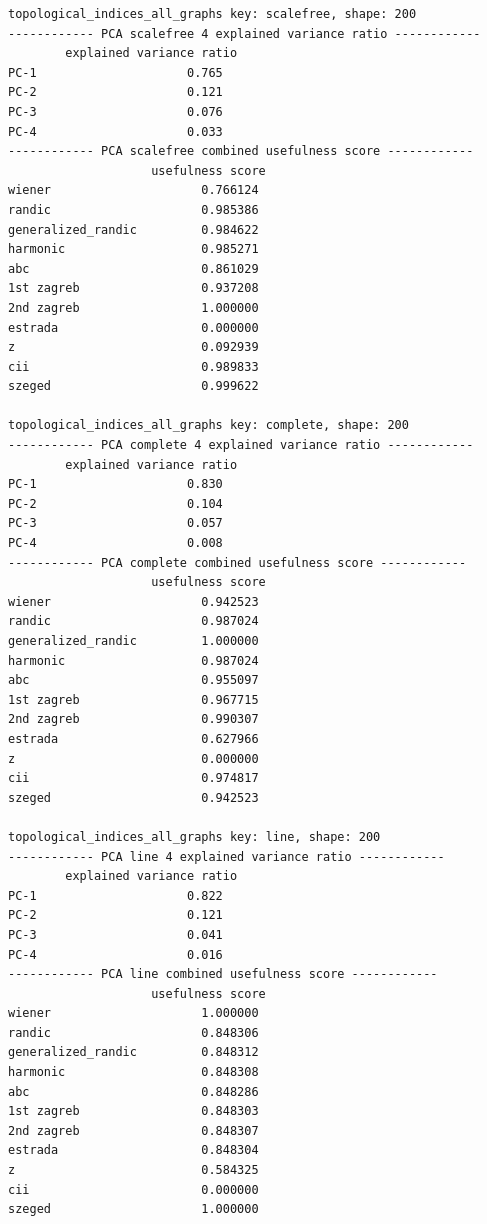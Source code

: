 \begin{code}
\begin{verbatim}
topological_indices_all_graphs key: scalefree, shape: 200
------------ PCA scalefree 4 explained variance ratio ------------
        explained variance ratio
PC-1                     0.765
PC-2                     0.121
PC-3                     0.076
PC-4                     0.033
------------ PCA scalefree combined usefulness score ------------
                    usefulness score
wiener                     0.766124
randic                     0.985386
generalized_randic         0.984622
harmonic                   0.985271
abc                        0.861029
1st zagreb                 0.937208
2nd zagreb                 1.000000
estrada                    0.000000
z                          0.092939
cii                        0.989833
szeged                     0.999622

topological_indices_all_graphs key: complete, shape: 200
------------ PCA complete 4 explained variance ratio ------------
        explained variance ratio
PC-1                     0.830
PC-2                     0.104
PC-3                     0.057
PC-4                     0.008
------------ PCA complete combined usefulness score ------------
                    usefulness score
wiener                     0.942523
randic                     0.987024
generalized_randic         1.000000
harmonic                   0.987024
abc                        0.955097
1st zagreb                 0.967715
2nd zagreb                 0.990307
estrada                    0.627966
z                          0.000000
cii                        0.974817
szeged                     0.942523

topological_indices_all_graphs key: line, shape: 200
------------ PCA line 4 explained variance ratio ------------
        explained variance ratio
PC-1                     0.822
PC-2                     0.121
PC-3                     0.041
PC-4                     0.016
------------ PCA line combined usefulness score ------------
                    usefulness score
wiener                     1.000000
randic                     0.848306
generalized_randic         0.848312
harmonic                   0.848308
abc                        0.848286
1st zagreb                 0.848303
2nd zagreb                 0.848307
estrada                    0.848304
z                          0.584325
cii                        0.000000
szeged                     1.000000


\end{verbatim}
\end{code}
